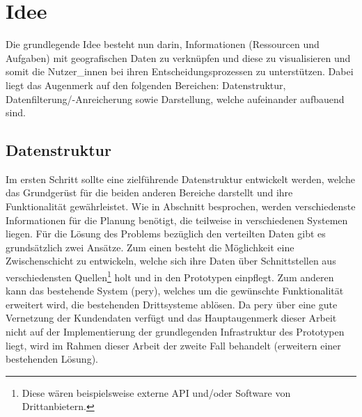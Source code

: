 \documentclass[Bachelorarbeit.tex]{subfiles}
\begin{document}
\begin{comment}
Als Grundlage für den Prototypen dient die Software Pery der Firma Perfany GmbH. 
Dabei handelt es sich um 
Wobei der Fokus auf dem Ticket Modul der Software ruht. Dabei ist das Anwendungskonzept des Moduls so ausgelegt das sämtliche Aufgaben, die die Firma betreffen , einzeln als Tickets erfasst werden. 
\end{comment}

\section{Idee}
\label{chap:einfuehrung:sec:idee}

Die grundlegende Idee besteht nun darin, Informationen (Ressourcen und Aufgaben) mit geografischen Daten zu verknüpfen und diese zu visualisieren und somit die Nutzer\_innen bei ihren Entscheidungsprozessen zu unterstützen. 
Dabei liegt das Augenmerk auf den folgenden Bereichen: Datenstruktur, Datenfilterung/-Anreicherung sowie Darstellung, welche aufeinander aufbauend sind. 


\subsection*{Datenstruktur}
Im ersten Schritt sollte eine zielführende Datenstruktur entwickelt werden, welche das Grundgerüst für die beiden anderen Bereiche darstellt und ihre Funktionalität gewährleistet.
Wie in Abschnitt  besprochen, werden verschiedenste Informationen für die Planung benötigt, die teilweise in verschiedenen Systemen liegen. 
Für die Lösung des Problems bezüglich den verteilten Daten gibt es grundsätzlich zwei Ansätze.
Zum einen besteht die Möglichkeit eine Zwischenschicht zu entwickeln, welche sich ihre Daten über Schnittstellen aus verschiedensten Quellen\footnote{Diese wären beispielsweise externe \ac{API} und/oder Software von Drittanbietern.} holt und in den Prototypen einpflegt.
Zum anderen kann das bestehende System (pery), welches um die gewünschte Funktionalität erweitert wird, die bestehenden Drittsysteme ablösen. 
Da pery über eine gute Vernetzung der Kundendaten verfügt und das Hauptaugenmerk dieser Arbeit nicht auf der Implementierung der grundlegenden Infrastruktur des Prototypen liegt, wird im Rahmen dieser Arbeit der zweite Fall behandelt (erweitern einer bestehenden Lösung).
\end{document}
